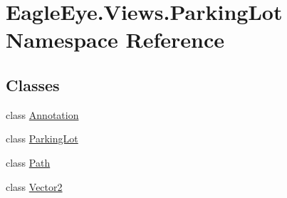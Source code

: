 \hypertarget{namespace_eagle_eye_1_1_views_1_1_parking_lot}{}\section{Eagle\+Eye.\+Views.\+Parking\+Lot Namespace Reference}
\label{namespace_eagle_eye_1_1_views_1_1_parking_lot}
\subsection*{Classes}
\begin{DoxyCompactItemize}
\item 
class \mbox{\hyperlink{class_eagle_eye_1_1_views_1_1_parking_lot_1_1_annotation}{Annotation}}
\item 
class \mbox{\hyperlink{class_eagle_eye_1_1_views_1_1_parking_lot_1_1_parking_lot}{Parking\+Lot}}
\item 
class \mbox{\hyperlink{class_eagle_eye_1_1_views_1_1_parking_lot_1_1_path}{Path}}
\item 
class \mbox{\hyperlink{class_eagle_eye_1_1_views_1_1_parking_lot_1_1_vector2}{Vector2}}
\end{DoxyCompactItemize}
